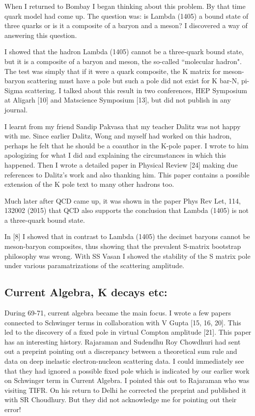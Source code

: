 When I returned to Bombay I began thinking about this pro\-blem. By that 
time quark model had come up. The question was: is Lambda (1405) a bound 
state of three quarks or is it a compo\-site of a baryon and a meson? I 
discovered a way of answering this question.

I showed that the hadron Lambda (1405) cannot be a three-quark bound 
state, but it is a composite of a baryon and meson, the so-called 
``molecular hadron". The test was simply that if it were a quark 
composite, the K matrix for meson-baryon scatte\-ring must have a pole but 
such a pole did not exist for K bar-N, pi-Sigma scattering. I talked 
about this result in two conferences, HEP Symposium at Aligarh [10] and 
Matscience Symposium [13], but did not publish in any journal.

I learnt from my friend Sandip Pakvasa that my teacher Dalitz was not 
happy with me. Since earlier Dalitz, Wong and myself had worked on this 
hadron, perhaps he felt that he should be a coauthor in the K-pole 
paper. I wrote to him apologizing for what I did and explaining the 
circumstances in which this happe\-ned. Then I wrote a detailed paper in 
Physical Review [24] ma\-king due references to Dalitz's work and also 
thanking him. This paper contains a possible extension of the K pole 
text to many other hadrons too.

Much later after QCD came up, it was shown in the paper Phys Rev Let, 
114, 132002 (2015) that QCD also supports the conclusion that Lambda 
(1405) is not a three-quark bound state.

In [8] I showed that in contrast to Lambda (1405) the decimet baryons 
cannot be meson-baryon composites, thus showing that the prevalent 
S-matrix bootstrap philosophy was wrong. With SS Vasan I showed the 
stability of the S matrix pole under various paramatrizations of the 
scattering amplitude.


\vspace{-.3cm}

\subsection*{Current Algebra, K decays etc:}


During 69-71, current algebra became the main focus. I wrote a few 
papers connected to Schwinger terms in collaboration with V Gupta 
[15, 16, 20]. This led to the discovery of a fixed pole in virtual Compton 
amplitude [21]. This paper has an interesting history. Rajaraman and 
Sudendhu Roy Chowdhuri had sent out a preprint pointing out a 
discrepancy between a theoretical sum rule and data on deep inelastic 
electron-nucleon scattering data. I could immediately see that they had 
ignored a possible fixed pole which is indicated by our earlier work on 
Schwinger term in Current Algebra. I pointed this out to Rajaraman who 
was visi\-ting TIFR. On his return to Delhi he corrected the preprint and 
published it with SR Choudhury. But they did not acknowledge me for 
pointing out their error!

